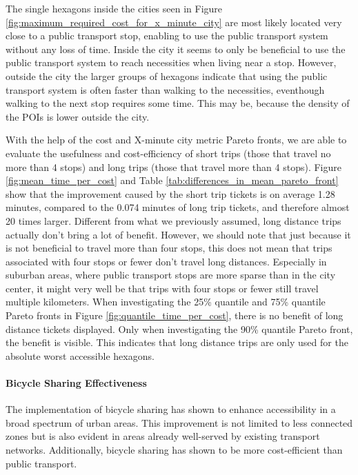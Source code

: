 The single hexagons inside the cities seen in Figure \ref{fig:maximum_required_cost_for_x_minute_city} are most likely located very close to a public transport stop, enabling to use the public transport system without any loss of time.
Inside the city it seems to only be beneficial to use the public transport system to reach necessities when living near a stop.
However, outside the city the larger groups of hexagons indicate that using the public transport system is often faster than walking to the necessities, eventhough walking to the next stop requires some time.
This may be, because the density of the POIs is lower outside the city.

With the help of the cost and X-minute city metric Pareto fronts, we are able to evaluate the usefulness and cost-efficiency of short trips (those that travel no more than 4 stops) and long trips (those that travel more than 4 stops).
Figure \ref{fig:mean_time_per_cost} and Table \ref{tab:differences_in_mean_pareto_front} show that the improvement caused by the short trip tickets is on average 1.28 minutes, compared to the 0.074 minutes of long trip tickets, and therefore almost 20 times larger.
Different from what we previously assumed, long distance trips actually don't bring a lot of benefit.
However, we should note that just because it is not beneficial to travel more than four stops, this does not mean that trips associated with four stops or fewer don't travel long distances.
Especially in suburban areas, where public transport stops are more sparse than in the city center, it might very well be that trips with four stops or fewer still travel multiple kilometers.
When investigating the 25\% quantile and 75\% quantile Pareto fronts in Figure \ref{fig:quantile_time_per_cost}, there is no benefit of long distance tickets displayed.
Only when investigating the 90\% quantile Pareto front, the benefit is visible.
This indicates that long distance trips are only used for the absolute worst accessible hexagons.

\paragraph{Bicycle Sharing Effectiveness}
The implementation of bicycle sharing has shown to enhance accessibility in a broad spectrum of urban areas. 
This improvement is not limited to less connected zones but is also evident in areas already well-served by existing transport networks.
Additionally, bicycle sharing has shown to be more cost-efficient than public transport.


